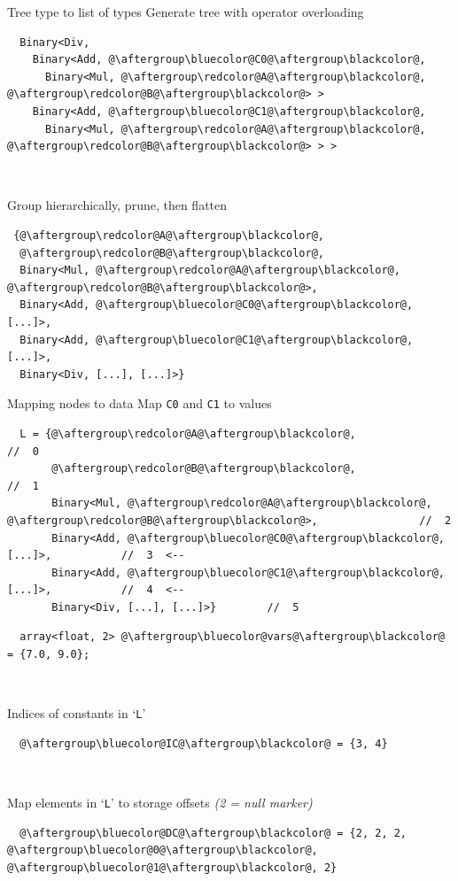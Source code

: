 \documentclass[xcolor=dvipsnames]{beamer}
\begin{document}
\begin{frame}[fragile]{Tree type to list of types}
Generate tree with operator overloading
\begin{lstlisting}
  Binary<Div,
    Binary<Add, @\aftergroup\bluecolor@C0@\aftergroup\blackcolor@,
      Binary<Mul, @\aftergroup\redcolor@A@\aftergroup\blackcolor@, @\aftergroup\redcolor@B@\aftergroup\blackcolor@> >
    Binary<Add, @\aftergroup\bluecolor@C1@\aftergroup\blackcolor@,
      Binary<Mul, @\aftergroup\redcolor@A@\aftergroup\blackcolor@, @\aftergroup\redcolor@B@\aftergroup\blackcolor@> > >
\end{lstlisting}

~

Group hierarchically, prune, then flatten
\begin{lstlisting}
 {@\aftergroup\redcolor@A@\aftergroup\blackcolor@,
  @\aftergroup\redcolor@B@\aftergroup\blackcolor@,
  Binary<Mul, @\aftergroup\redcolor@A@\aftergroup\blackcolor@, @\aftergroup\redcolor@B@\aftergroup\blackcolor@>,
  Binary<Add, @\aftergroup\bluecolor@C0@\aftergroup\blackcolor@, [...]>,
  Binary<Add, @\aftergroup\bluecolor@C1@\aftergroup\blackcolor@, [...]>,
  Binary<Div, [...], [...]>}
\end{lstlisting}
\end{frame}


\begin{frame}[fragile]{Mapping nodes to data}
Map {\color{blue}\texttt{C0}} and {\color{blue}\texttt{C1}} to values
\begin{lstlisting}
  L = {@\aftergroup\redcolor@A@\aftergroup\blackcolor@,                                //  0
       @\aftergroup\redcolor@B@\aftergroup\blackcolor@,                                //  1
       Binary<Mul, @\aftergroup\redcolor@A@\aftergroup\blackcolor@, @\aftergroup\redcolor@B@\aftergroup\blackcolor@>,                //  2
       Binary<Add, @\aftergroup\bluecolor@C0@\aftergroup\blackcolor@, [...]>,           //  3  <--
       Binary<Add, @\aftergroup\bluecolor@C1@\aftergroup\blackcolor@, [...]>,           //  4  <--
       Binary<Div, [...], [...]>}        //  5
\end{lstlisting}
\begin{lstlisting}
  array<float, 2> @\aftergroup\bluecolor@vars@\aftergroup\blackcolor@ = {7.0, 9.0};
\end{lstlisting}

~

Indices of constants in `\texttt{L}'
\begin{lstlisting}
  @\aftergroup\bluecolor@IC@\aftergroup\blackcolor@ = {3, 4}
\end{lstlisting}

~

Map elements in `\texttt{L}' to storage offsets \emph{(2 = null marker)}
\begin{lstlisting}
  @\aftergroup\bluecolor@DC@\aftergroup\blackcolor@ = {2, 2, 2, @\aftergroup\bluecolor@0@\aftergroup\blackcolor@, @\aftergroup\bluecolor@1@\aftergroup\blackcolor@, 2}
\end{lstlisting}
\end{frame}
\end{document}
